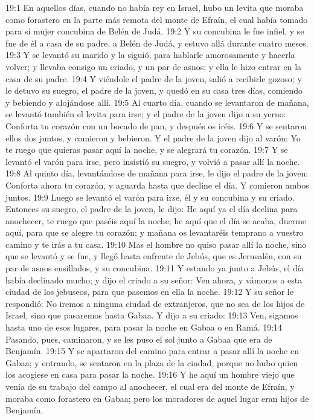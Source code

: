 19:1 En aquellos días, cuando no había rey en Israel, hubo un levita que moraba como forastero en la parte más remota del monte de Efraín, el cual había tomado para sí mujer concubina de Belén de Judá.  
19:2 Y su concubina le fue infiel, y se fue de él a casa de su padre, a Belén de Judá, y estuvo allá durante cuatro meses. 
19:3 Y se levantó su marido y la siguió, para hablarle amorosamente y hacerla volver; y llevaba consigo un criado, y un par de asnos; y ella le hizo entrar en la casa de su padre.  
19:4 Y viéndole el padre de la joven, salió a recibirle gozoso; y le detuvo su suegro, el padre de la joven, y quedó en su casa tres días, comiendo y bebiendo y alojándose allí.  
19:5 Al cuarto día, cuando se levantaron de mañana, se levantó también el levita para irse; y el padre de la joven dijo a su yerno: Conforta tu corazón con un bocado de pan, y después os iréis.  
19:6 Y se sentaron ellos dos juntos, y comieron y bebieron. Y el padre de la joven dijo al varón: Yo te ruego que quieras pasar aquí la noche, y se alegrará tu corazón.  
19:7 Y se levantó el varón para irse, pero insistió su suegro, y volvió a pasar allí la noche.  
19:8 Al quinto día, levantándose de mañana para irse, le dijo el padre de la joven: Conforta ahora tu corazón, y aguarda hasta que decline el día. Y comieron ambos juntos.  
19:9 Luego se levantó el varón para irse, él y su concubina y su criado. Entonces su suegro, el padre de la joven, le dijo: He aquí ya el día declina para anochecer, te ruego que paséis aquí la noche; he aquí que el día se acaba, duerme aquí, para que se alegre tu corazón; y mañana os levantaréis temprano a vuestro camino y te irás a tu casa.  
19:10 Mas el hombre no quiso pasar allí la noche, sino que se levantó y se fue, y llegó hasta enfrente de Jebús, que es Jerusalén, con su par de asnos ensillados, y su concubina.  
19:11 Y estando ya junto a Jebús, el día había declinado mucho; y dijo el criado a su señor: Ven ahora, y vámonos a esta ciudad de los jebuseos, para que pasemos en ella la noche.  
19:12 Y su señor le respondió: No iremos a ninguna ciudad de extranjeros, que no sea de los hijos de Israel, sino que pasaremos hasta Gabaa. Y dijo a su criado:  
19:13 Ven, sigamos hasta uno de esos lugares, para pasar la noche en Gabaa o en Ramá.  
19:14 Pasando, pues, caminaron, y se les puso el sol junto a Gabaa que era de Benjamín.  
19:15 Y se apartaron del camino para entrar a pasar allí la noche en Gabaa; y entrando, se sentaron en la plaza de la ciudad, porque no hubo quien los acogiese en casa para pasar la noche.  
19:16 Y he aquí un hombre viejo que venía de su trabajo del campo al anochecer, el cual era del monte de Efraín, y moraba como forastero en Gabaa; pero los moradores de aquel lugar eran hijos de Benjamín.  

